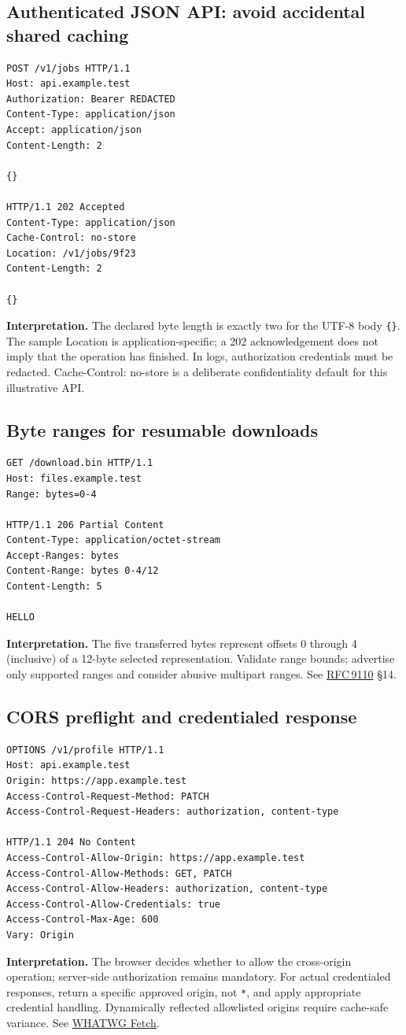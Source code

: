 \documentclass[10pt,letterpaper,oneside]{article}
\newcommand{\field}[1]{{\ttfamily\small\color{Deep}#1}}
\newcommand{\rf}[1]{\href{https://www.rfc-editor.org/rfc/rfc#1.html}{RFC\,#1}}
\newcommand{\stdlink}[2]{\href{#1}{#2}}
\begin{document}
\subsection{Authenticated JSON API: avoid accidental shared caching}
\begin{lstlisting}
POST /v1/jobs HTTP/1.1
Host: api.example.test
Authorization: Bearer REDACTED
Content-Type: application/json
Accept: application/json
Content-Length: 2

{}

HTTP/1.1 202 Accepted
Content-Type: application/json
Cache-Control: no-store
Location: /v1/jobs/9f23
Content-Length: 2

{}
\end{lstlisting}
\textbf{Interpretation.} The declared byte length is exactly two for the UTF-8 body \texttt{\{\}}. The sample \field{Location} is application-specific; a 202 acknowledgement does not imply that the operation has finished. In logs, authorization credentials must be redacted. \field{Cache-Control: no-store} is a deliberate confidentiality default for this illustrative API.

\subsection{Byte ranges for resumable downloads}
\begin{lstlisting}
GET /download.bin HTTP/1.1
Host: files.example.test
Range: bytes=0-4

HTTP/1.1 206 Partial Content
Content-Type: application/octet-stream
Accept-Ranges: bytes
Content-Range: bytes 0-4/12
Content-Length: 5

HELLO
\end{lstlisting}
\textbf{Interpretation.} The five transferred bytes represent offsets 0 through 4 (inclusive) of a 12-byte selected representation. Validate range bounds; advertise only supported ranges and consider abusive multipart ranges. See \rf{9110} \S14.

\subsection{CORS preflight and credentialed response}
\begin{lstlisting}
OPTIONS /v1/profile HTTP/1.1
Host: api.example.test
Origin: https://app.example.test
Access-Control-Request-Method: PATCH
Access-Control-Request-Headers: authorization, content-type

HTTP/1.1 204 No Content
Access-Control-Allow-Origin: https://app.example.test
Access-Control-Allow-Methods: GET, PATCH
Access-Control-Allow-Headers: authorization, content-type
Access-Control-Allow-Credentials: true
Access-Control-Max-Age: 600
Vary: Origin
\end{lstlisting}
\textbf{Interpretation.} The browser decides whether to allow the cross-origin operation; server-side authorization remains mandatory. For actual credentialed responses, return a specific approved origin, not \texttt{*}, and apply appropriate credential handling. Dynamically reflected allowlisted origins require cache-safe variance. See \stdlink{https://fetch.spec.whatwg.org/}{WHATWG Fetch}.
\end{document}
